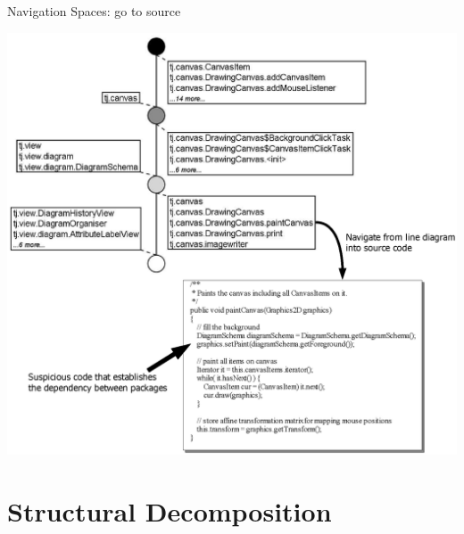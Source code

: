 \documentclass[pdf,prettybox]{prosper}
\begin{document}
\begin{slide}{Navigation Spaces: go to source}
 \begin{center}
  \includegraphics[height=0.8 \textheight]{img/sourceNavigation.eps}
 \end{center}
\end{slide}

\part{Structural Decomposition}

\end{document}
